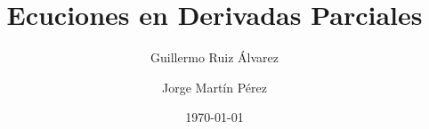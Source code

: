 \documentclass{article}
\begin{document}
\newtheorem{theorem}{Theorem}
\DeclarePairedDelimiter\norm\lVert\rVert

\newtheorem{lemma}{Lemma}


\title{Ecuciones en Derivadas Parciales}
\author{Guillermo Ruiz Álvarez \and Jorge Martín Pérez}
\date{\today}
\maketitle


\cleardoublepage

\end{document}
